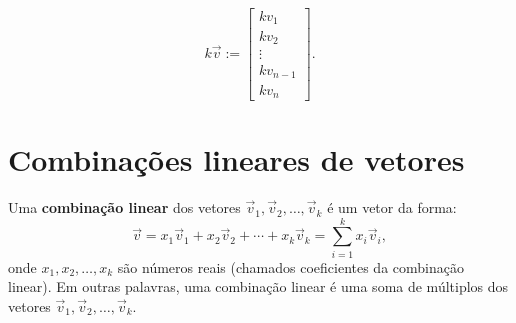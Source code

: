 \begin{equation}
k \vec{v} :=
\left[
  \begin{array}{c}
    k v_1 \\
    k v_2 \\
    \vdots \\
    k v_{n-1} \\
    k v_n
  \end{array}
\right].
\end{equation}








\section{Combinações lineares de vetores}

Uma \textbf{combinação linear} dos vetores $\vec{v}_1, \vec{v}_2, \dots, \vec{v}_k$ é um vetor da forma:
\begin{equation}
\vec{v} = x_1 \vec{v}_1 + x_2 \vec{v}_2 + \cdots + x_k \vec{v}_k = \sum_{i=1}^k x_i \vec{v}_i,
\end{equation} onde $x_1, x_2, \dots, x_k$ são números reais (chamados coeficientes da combinação linear). Em outras palavras, uma combinação linear é uma soma de múltiplos dos vetores $\vec{v}_1, \vec{v}_2, \dots, \vec{v}_k$.


